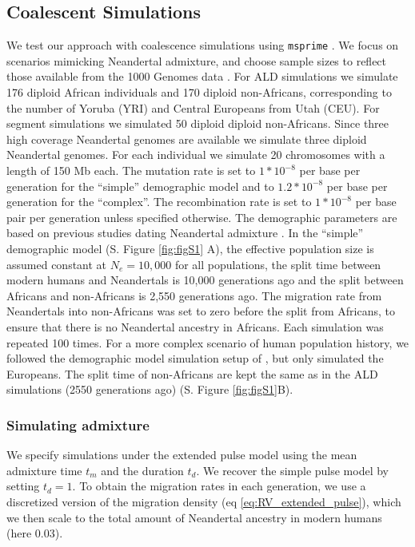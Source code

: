 \documentclass[11pt]{article}
\begin{document}
\subsection{Coalescent Simulations}\label{coalescent simulations}

We test our approach with coalescence simulations using  \texttt{msprime} 
\citep{kelleher_efficient_2016}. We focus on scenarios mimicking Neandertal admixture, and choose sample sizes to reflect those available from the 1000 Genomes data \citep{the_1000_genomes_project_consortium_global_2015}. For ALD simulations we simulate 176 diploid
African individuals and 170 diploid non-Africans, corresponding to the
number of Yoruba (YRI) and Central Europeans from Utah (CEU). For segment simulations we simulated 50 diploid diploid non-Africans.
Since three high coverage Neandertal genomes are available \citep{prufer_complete_2013,prufer_high-coverage_2017,mafessoni_high_coverage_2020} we  simulate three diploid Neandertal genomes. For each individual we simulate 20
chromosomes with a length of 150 Mb each. The mutation rate is set to
 \(1*10^{-8}\) per base per generation for the ``simple'' demographic model and to  \(1.2*10^{-8}\) per base per generation for the ``complex''. The
recombination rate is set to \(1*10^{-8}\) per base pair per generation
unless specified otherwise. The demographic parameters are based on
previous studies dating Neandertal admixture
\citep{sankararaman_date_2012,fu_genome_2014,moorjani_genetic_2016,skov_detecting_2018}. In
the ``simple'' demographic model (S. Figure  \ref{fig:figS1} A), the effective
population size is assumed constant at $N_e=10,000$ for all populations, the
split time between modern humans and Neandertals is 10,000 generations
ago and the split between Africans and non-Africans is 2,550
generations ago. The migration rate from Neandertals into non-Africans
was set to zero before the split from Africans, to ensure that there is no Neandertal
ancestry in Africans. Each simulation was repeated 100 times. For a more complex scenario of human population history, we followed the demographic model simulation setup of \cite{skov_detecting_2018}, but only simulated the Europeans. The split time of  non-Africans are kept the same as in the ALD simulations (2550 generations ago) (S. Figure \ref{fig:figS1}B).  


\subsubsection{Simulating admixture}\label{Simulating the expanded pulse}
We specify simulations under the extended pulse model using the mean admixture time $t_m$ and the duration $t_d$. We recover the simple pulse model by setting $t_d=1$. To obtain the migration rates in each generation, we use a discretized version of the migration density (eq \ref{eq:RV_extended_pulse}), which we then scale to the total amount of Neandertal ancestry in modern humans (here 0.03). 
\end{document}
